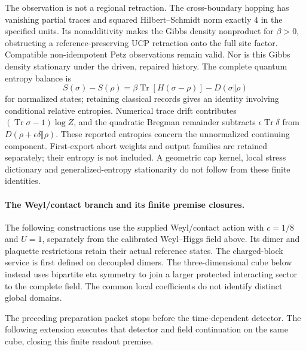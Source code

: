 The observation is not a regional retraction. The cross-boundary hopping
has vanishing partial traces and squared Hilbert--Schmidt norm exactly
$4$ in the specified units. Its nonadditivity makes the Gibbs density
nonproduct for $\beta>0$, obstructing a reference-preserving UCP retraction
onto the full site factor. Compatible non-idempotent Petz observations
remain valid. Nor is this Gibbs density stationary under the driven,
repaired history. The complete quantum entropy balance is
\[
 S(\sigma)-S(\rho)=\beta\operatorname{Tr}[H(\sigma-\rho)]
                  -D(\sigma\Vert\rho)
\]
for normalized states; retaining classical records gives an identity
involving conditional relative entropies. Numerical trace drift contributes
$(\operatorname{Tr}\sigma-1)\log Z$, and the quadratic Bregman remainder
subtracts $\epsilon\operatorname{Tr}\delta$ from
$D(\rho+\epsilon\delta\Vert\rho)$. These reported entropies concern the
unnormalized continuing component. First-export abort weights and output
families are retained separately; their entropy is not included. A
geometric cap kernel, local stress dictionary and generalized-entropy
stationarity do not follow from these finite identities.

\paragraph{The Weyl/contact branch and its finite premise closures.}
The following constructions use the supplied Weyl/contact action with
$c=1/8$ and $U=1$, separately from the calibrated Weyl--Higgs field above.
Its dimer and plaquette restrictions retain their actual reference states.
The charged-block service is first defined on decoupled dimers. The
three-dimensional cube below instead uses bipartite eta symmetry to
join a larger protected interacting sector to the complete field.
The common local coefficients do not identify distinct global domains.

{}
{}
{}
{}

The preceding preparation packet stops before the time-dependent detector.
The following extension executes that detector and field continuation on
the same cube, closing this finite readout premise.

